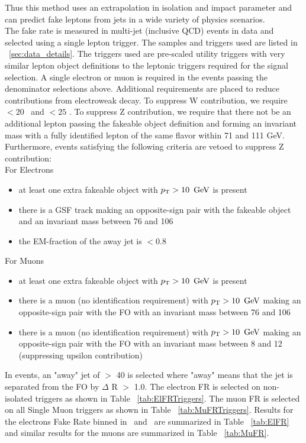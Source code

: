 Thus this method uses an extrapolation in isolation and impact parameter and can predict fake leptons from jets in a wide variety of physics scenarios.\\

The fake rate is measured in multi-jet (inclusive QCD) events in data and selected using a single lepton trigger. The samples and triggers used are listed in ~\ref{sec:data_details}. The triggers used are pre-scaled utility triggers with very similar lepton object definitions to the leptonic triggers required for the signal selection. A single electron or muon is required in the events passing the denominator selections above. Additional requirements are placed to reduce contributions from electroweak decay. To suppress W contribution, we require  \MET  $\lt 20$ \GeV \ and \Mt $\lt 25$ \GeV. To suppress Z contribution, we require that there not be an additional lepton passing the fakeable object definition and forming an invariant mass with a fully identified lepton of the same flavor within 71 and 111 GeV. Furthermore, events satisfying the following criteria are vetoed to suppress Z contribution:\\
For Electrons
\begin{itemize}
\item at least one extra fakeable object with $p_{\mathrm{T}} > 10 \ \,\text{Ge\hspace{-.08em}V}$ is present
\item there is a GSF track making an opposite-sign pair with the fakeable object and an invariant mass between 76 and 106 \GeV
\item the EM-fraction of the away jet is $\lt 0.8$
\end{itemize}

For Muons
\begin{itemize} 
\item at least one extra fakeable object with $p_{\mathrm{T}} > 10 \ \,\text{Ge\hspace{-.08em}V}$ is present
\item there is a muon (no identification requirement) with $p_{\mathrm{T}} > 10 \ \,\text{Ge\hspace{-.08em}V}$ making an opposite-sign pair with 	the FO with an invariant mass between 76 and 106 \GeV
\item there is a muon (no identification requirement) with $p_{\mathrm{T}} > 10 \ \,\text{Ge\hspace{-.08em}V}$ making an opposite-sign pair with the FO with an invariant mass between 8 and 12 \GeV (suppressing upsilon contribution)
\end{itemize}
In events, an "away" jet of \pt $\gt$ 40 \GeV is selected where "away" means that the jet is separated from the FO by $\Delta$ R $\gt$ 1.0. The electron FR is selected on non-isolated triggers as shown in Table ~\ref{tab:ElFRTriggers}. The muon FR is selected on all Single Muon triggers as shown in Table ~\ref{tab:MuFRTriggers}. Results for the electrons Fake Rate binned in \pt \ and \aeta \ are summarized in Table ~\ref{tab:ElFR} and similar results for the muons are summarized in Table ~\ref{tab:MuFR}.\\

